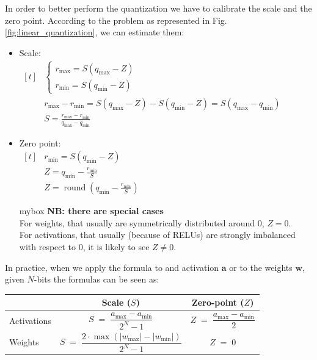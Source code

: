 In order to better perform the quantization we have to calibrate the scale and the zero point. According to the problem as represented in Fig.\ref{fig:linear_quantization}, we can estimate them:
\begin{itemize}
    \item Scale:
        \\[1.5ex]
        $\begin{aligned}[t]
            &\begin{cases}
                r_{\text{max}} = S(q_{\text{max}} - Z) \\
                r_{\text{min}} = S(q_{\text{min}} - Z)
            \end{cases} 
            \\[1.5ex]
            &r_{\text{max}} - r_{\text{min}} = S(q_{\text{max}} - Z) - S(q_{\text{min}} - Z) = S(q_{\text{max}} - q_{\text{min}})
            \\[1.2ex]
            &S = \frac{r_{\text{max}} - r_{\text{min}}}{q_{\text{max}} - q_{\text{min}}}
        \end{aligned}$

    \item Zero point:
        \\[1.5ex]
        $\begin{aligned}[t]
            &r_{\text{min}} = S(q_{\text{min}} - Z)
            \\[1.5ex]
            &Z = q_{\text{min}} - \frac{r_{\text{min}}}{S}
            \\[1.2ex]
            &Z = \operatorname{round}\left(q_{\text{min}} - \frac{r_{\text{min}}}{S}\right)
        \end{aligned}$

        mybox{
            \textbf{NB: there are special cases} \\
            For weights, that usually are symmetrically distributed around 0, $Z=0$.\\
            For activations, that usually (because of RELUs) are strongly imbalanced with respect to 0, it is likely to see $Z\neq0$.
        }
\end{itemize}

In practice, when we apply the formula to and activation $\textbf{a}$ or to the weights $\textbf{w}$, given $N$-bits the formulas can be seen as:

\begin{table}[H]
    \centering
    \label{tab:placeholder}
    \begin{tabular}{lcc}
        \toprule
        & Scale ($S$) & Zero-point ($Z$) \\
        \midrule
        Activations & 
        $S \;=\; \dfrac{a_{\text{max}} - a_{\text{min}}}{2^N - 1}$ & 
        $Z \;=\; \dfrac{a_{\text{max}} - a_{\text{min}}}{2}$ \\[4pt]
        Weights & 
        $S \;=\; \dfrac{2 \cdot \max(|w_{\text{max}}| - |w_{\text{min}}|)}{2^N - 1}$ & 
        $Z \;=\; 0$ \\
        \bottomrule
    \end{tabular}
\end{table}



